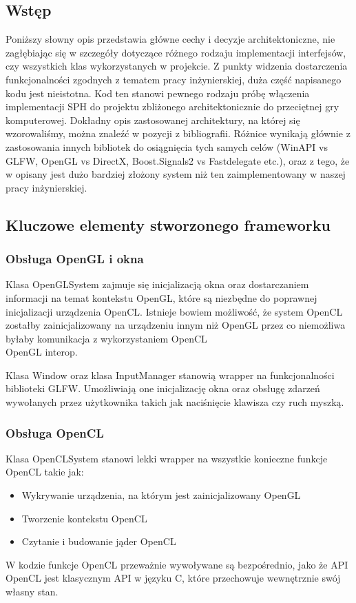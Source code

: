 \documentclass[polish, 12pt]{aghthesis}
\begin{document}
	\subsection{Wstęp}
		Poniższy słowny opis przedstawia główne cechy i decyzje architektoniczne, nie zagłębiając się w szczegóły dotyczące różnego rodzaju implementacji interfejsów, czy wszystkich klas wykorzystanych w projekcie. Z punkty widzenia dostarczenia funkcjonalności zgodnych z tematem pracy inżynierskiej, duża część napisanego kodu jest nieistotna. Kod ten stanowi pewnego rodzaju próbę włączenia implementacji SPH do projektu zbliżonego architektonicznie do przeciętnej gry komputerowej. Dokładny opis zastosowanej architektury, na której się wzorowaliśmy, można znaleźć w pozycji \cite{GameCodingComplete} z bibliografii. Różnice wynikają głównie z zastosowania innych bibliotek do osiągnięcia tych samych celów (WinAPI vs GLFW, OpenGL vs DirectX, Boost.Signals2 vs Fastdelegate etc.), oraz z tego, że w \cite{GameCodingComplete} opisany jest dużo bardziej złożony system niż ten zaimplementowany w naszej pracy inżynierskiej.
	
	\subsection{Kluczowe elementy stworzonego frameworku}
		\subsubsection{Obsługa OpenGL i okna}
			Klasa OpenGLSystem zajmuje się inicjalizacją okna oraz dostarczaniem informacji na temat kontekstu OpenGL, które są niezbędne do poprawnej inicjalizacji urządzenia OpenCL. Istnieje bowiem możliwość, że system OpenCL zostałby zainicjalizowany na urządzeniu innym niż OpenGL przez co niemożliwa byłaby komunikacja z wykorzystaniem OpenCL\\OpenGL interop.
			
			Klasa Window oraz klasa InputManager stanowią wrapper na funkcjonalności biblioteki GLFW. Umożliwiają one inicjalizację okna oraz obsługę zdarzeń wywołanych przez użytkownika takich jak naciśnięcie klawisza czy ruch myszką. 
			
		\subsubsection{Obsługa OpenCL}
			Klasa OpenCLSystem stanowi lekki wrapper na wszystkie konieczne funkcje OpenCL takie jak:
			\begin{itemize}
				\item Wykrywanie urządzenia, na którym jest zainicjalizowany OpenGL
				\item Tworzenie kontekstu OpenCL
				\item Czytanie i budowanie jąder OpenCL
			\end{itemize}
			W kodzie funkcje OpenCL przeważnie wywoływane są bezpośrednio, jako że API OpenCL jest klasycznym API w języku C, które przechowuje wewnętrznie swój własny stan.
			
\end{document}
